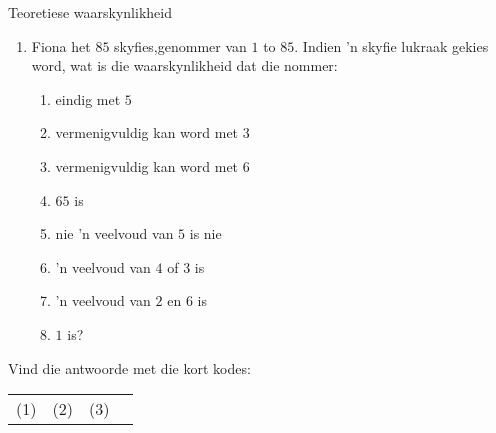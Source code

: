 \begin{exercises}{Teoretiese waarskynlikheid}
\begin{enumerate}[itemsep=5pt, label=\textbf{\arabic*}]
  \item Fiona het $85$ skyfies,genommer van $1$ to
    $85$. Indien 'n skyfie lukraak gekies word, wat is die waarskynlikheid dat die nommer: 
    \begin{enumerate}
    \item eindig met $5$
    \item vermenigvuldig kan word met $3$
    \item vermenigvuldig kan word met  $6$
    \item $65$ is
    \item nie 'n veelvoud van $5$ is nie
    \item 'n veelvoud van $4$ of $3$ is
    \item 'n veelvoud van $2$ en $6$ is
    \item  $1$ is?
    \end{enumerate}
  \end{enumerate}

  Vind die antwoorde met die kort kodes: \\
  \begin{tabularx}{\textwidth}{XXXX}
    (1) & (2) & (3) \\
  \end{tabularx}
\end{exercises}

